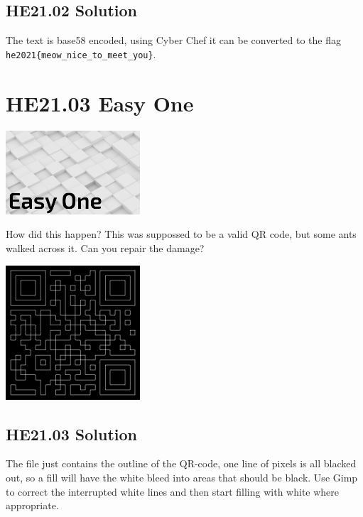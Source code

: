 \documentclass[english,a4paper,nols,noindent]{tufte-handout}
\begin{document}
\hypertarget{he21.02-solution}{%
\subsection{HE21.02 Solution}\label{he21.02-solution}}

The text is base58 encoded, using Cyber Chef it can be converted to
the flag \verb+he2021{meow_nice_to_meet_you}+.

\hypertarget{he21.03}{%
\section{HE21.03 Easy One}\label{he21.03}}

\begin{marginfigure}
    \includegraphics[width=50mm]{images/challenge3.jpg}
\end{marginfigure}

\noindent How did this happen? This was suppossed to be a
valid QR code, but some ants walked across it. Can you repair the
damage?

\begin{marginfigure}
    \includegraphics[width=50mm]{ch03/easyone.png}
\end{marginfigure}

\hypertarget{he21.03-solution}{%
\subsection{HE21.03 Solution}\label{he21.03-solution}}

\noindent The file just contains the outline of the QR-code, one line
of pixels is all blacked out, so a fill will have the white bleed into
areas that should be black.  Use Gimp to correct the interrupted white
lines and then start filling with white where appropriate.
\end{document}
